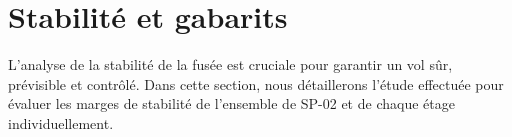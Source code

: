 \section{Stabilité et gabarits}
\label{sec:stabilite}

L'analyse de la stabilité de la fusée est cruciale pour garantir un vol sûr, prévisible et contrôlé. Dans cette section, nous
détaillerons l'étude effectuée pour évaluer les marges de stabilité de l'ensemble de SP-02 et de chaque étage individuellement.




\newpage
